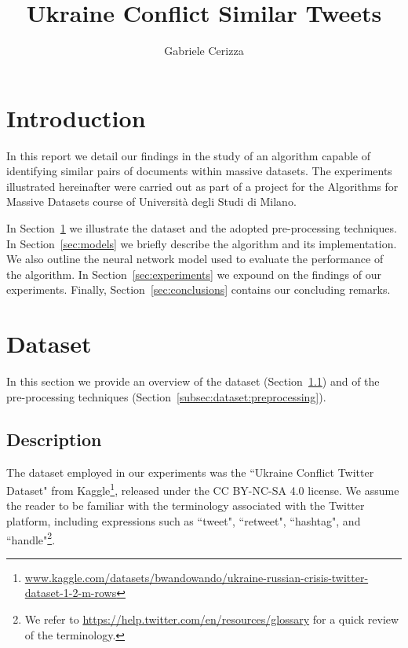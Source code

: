 \documentclass[runningheads]{llncs}
\begin{document}
\title{
    Ukraine Conflict Similar Tweets
}
\author{Gabriele Cerizza}


\maketitle

\section*{Introduction}
\label{sec:introduction}

In this report we detail our findings in the study of an algorithm capable of identifying similar pairs of documents within massive datasets. The experiments illustrated hereinafter were carried out as part of a project for the Algorithms for Massive Datasets course of Università degli Studi di Milano.

In Section~\ref{sec:dataset} we illustrate the dataset and the adopted pre-processing techniques. In Section~\ref{sec:models} we briefly describe the algorithm and its implementation. We also outline the neural network model used to evaluate the performance of the algorithm. In Section~\ref{sec:experiments} we expound on the findings of our experiments. Finally, Section~\ref{sec:conclusions} contains our concluding remarks.

\section{Dataset}
\label{sec:dataset}

In this section we provide an overview of the dataset (Section~\ref{subsec:dataset:description}) and of the pre-processing techniques (Section~\ref{subsec:dataset:preprocessing}).

\subsection{Description}
\label{subsec:dataset:description}

The dataset employed in our experiments was the “Ukraine Conflict Twitter Dataset" from Kaggle\footnote{\url{www.kaggle.com/datasets/bwandowando/ukraine-russian-crisis-twitter-dataset-1-2-m-rows}}, released under the CC BY-NC-SA 4.0 license. We assume the reader to be familiar with the terminology associated with the Twitter platform, including expressions such as “tweet", “retweet", “hashtag", and “handle"\footnote{We refer to \url{https://help.twitter.com/en/resources/glossary} for a quick review of the terminology.}.
\end{document}
